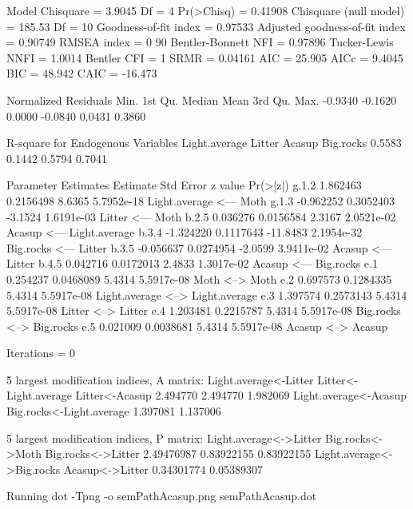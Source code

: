 \documentclass[12pt]{article}
\begin{document}
\begin{Schunk}
\begin{Soutput}
 Model Chisquare =  3.9045   Df =  4 Pr(>Chisq) = 0.41908
 Chisquare (null model) =  185.53   Df =  10
 Goodness-of-fit index =  0.97533
 Adjusted goodness-of-fit index =  0.90749
 RMSEA index =  0   90%
 Bentler-Bonnett NFI =  0.97896
 Tucker-Lewis NNFI =  1.0014
 Bentler CFI =  1
 SRMR =  0.04161
 AIC =  25.905
 AICc =  9.4045
 BIC =  48.942
 CAIC =  -16.473

 Normalized Residuals
   Min. 1st Qu.  Median    Mean 3rd Qu.    Max. 
-0.9340 -0.1620  0.0000 -0.0840  0.0431  0.3860 

 R-square for Endogenous Variables
Light.average        Litter        Acasup     Big.rocks 
       0.5583        0.1442        0.5794        0.7041 

 Parameter Estimates
      Estimate  Std Error z value  Pr(>|z|)                                   
g.1.2  1.862463 0.2156498   8.6365 5.7952e-18 Light.average <--- Moth         
g.1.3 -0.962252 0.3052403  -3.1524 1.6191e-03 Litter <--- Moth                
b.2.5  0.036276 0.0156584   2.3167 2.0521e-02 Acasup <--- Light.average       
b.3.4 -1.324220 0.1117643 -11.8483 2.1954e-32 Big.rocks <--- Litter           
b.3.5 -0.056637 0.0274954  -2.0599 3.9411e-02 Acasup <--- Litter              
b.4.5  0.042716 0.0172013   2.4833 1.3017e-02 Acasup <--- Big.rocks           
e.1    0.254237 0.0468089   5.4314 5.5917e-08 Moth <--> Moth                  
e.2    0.697573 0.1284335   5.4314 5.5917e-08 Light.average <--> Light.average
e.3    1.397574 0.2573143   5.4314 5.5917e-08 Litter <--> Litter              
e.4    1.203481 0.2215787   5.4314 5.5917e-08 Big.rocks <--> Big.rocks        
e.5    0.021009 0.0038681   5.4314 5.5917e-08 Acasup <--> Acasup              

 Iterations =  0 
\end{Soutput}
\begin{Soutput}
 5 largest modification indices, A matrix:
   Light.average<-Litter    Litter<-Light.average           Litter<-Acasup 
                2.494770                 2.494770                 1.982069 
   Light.average<-Acasup Big.rocks<-Light.average 
                1.397081                 1.137006 

  5 largest modification indices, P matrix:
   Light.average<->Litter          Big.rocks<->Moth        Big.rocks<->Litter 
               2.49476987                0.83922155                0.83922155 
Light.average<->Big.rocks           Acasup<->Litter 
               0.34301774                0.05389307 
\end{Soutput}
\begin{Soutput}
Running  dot -Tpng -o semPathAcasup.png  semPathAcasup.dot 
\end{Soutput}
\end{Schunk}
\end{document}
